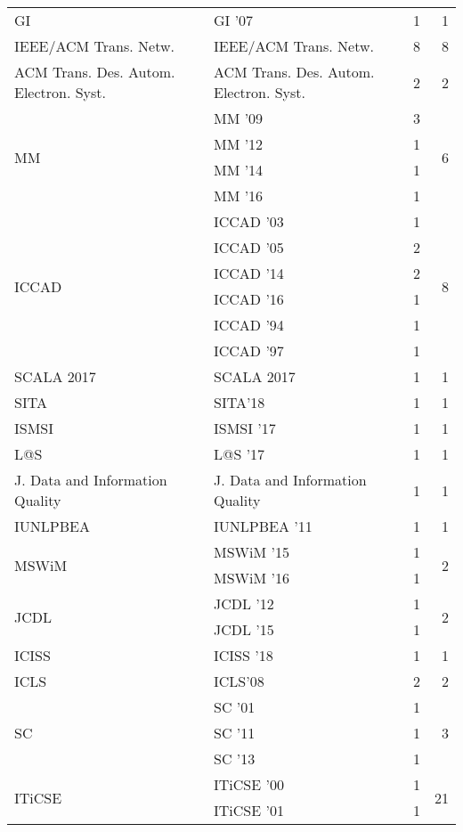 \begin{table*}[t]
\begin{tabular}{llrr}
\multirow{1}{*}{GI } & GI '07 & 1 & \multirow{1}{*}{1}\\
\multirow{1}{*}{IEEE/ACM Trans. Netw.} & IEEE/ACM Trans. Netw. & 8 & \multirow{1}{*}{8}\\
\multirow{1}{*}{ACM Trans. Des. Autom. Electron. Syst.} & ACM Trans. Des. Autom. Electron. Syst. & 2 & \multirow{1}{*}{2}\\
\multirow{4}{*}{MM } & MM '09 & 3 & \multirow{4}{*}{6}\\
& MM '12 & 1 &\\
& MM '14 & 1 &\\
& MM '16 & 1 &\\
\multirow{6}{*}{ICCAD } & ICCAD '03 & 1 & \multirow{6}{*}{8}\\
& ICCAD '05 & 2 &\\
& ICCAD '14 & 2 &\\
& ICCAD '16 & 1 &\\
& ICCAD '94 & 1 &\\
& ICCAD '97 & 1 &\\
\multirow{1}{*}{SCALA 2017} & SCALA 2017 & 1 & \multirow{1}{*}{1}\\
\multirow{1}{*}{SITA} & SITA'18 & 1 & \multirow{1}{*}{1}\\
\multirow{1}{*}{ISMSI } & ISMSI '17 & 1 & \multirow{1}{*}{1}\\
\multirow{1}{*}{L@S } & L@S '17 & 1 & \multirow{1}{*}{1}\\
\multirow{1}{*}{J. Data and Information Quality} & J. Data and Information Quality & 1 & \multirow{1}{*}{1}\\
\multirow{1}{*}{IUNLPBEA } & IUNLPBEA '11 & 1 & \multirow{1}{*}{1}\\
\multirow{2}{*}{MSWiM } & MSWiM '15 & 1 & \multirow{2}{*}{2}\\
& MSWiM '16 & 1 &\\
\multirow{2}{*}{JCDL } & JCDL '12 & 1 & \multirow{2}{*}{2}\\
& JCDL '15 & 1 &\\
\multirow{1}{*}{ICISS } & ICISS '18 & 1 & \multirow{1}{*}{1}\\
\multirow{1}{*}{ICLS} & ICLS'08 & 2 & \multirow{1}{*}{2}\\
\multirow{3}{*}{SC } & SC '01 & 1 & \multirow{3}{*}{3}\\
& SC '11 & 1 &\\
& SC '13 & 1 &\\
\multirow{15}{*}{ITiCSE } & ITiCSE '00 & 1 & \multirow{15}{*}{21}\\
& ITiCSE '01 & 1 &\\

\end{tabular}
\end{table*}

